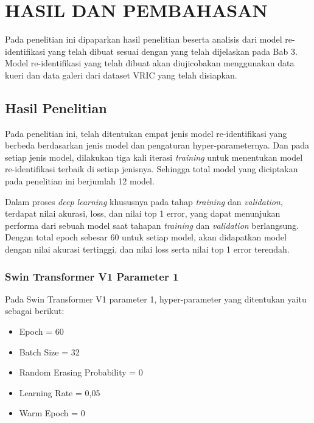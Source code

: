\chapter{HASIL DAN PEMBAHASAN}
\label{chap:hasildanpembahasan}


Pada penelitian ini dipaparkan hasil penelitian beserta analisis dari model re-identifikasi yang telah dibuat sesuai dengan 
yang telah dijelaskan pada Bab 3. Model re-identifikasi yang telah dibuat akan diujicobakan menggunakan data 
kueri dan data galeri dari dataset VRIC yang telah disiapkan. 

\section{Hasil Penelitian}
\label{sec:hasilpenelitian}

Pada penelitian ini, telah ditentukan empat jenis model re-identifikasi yang berbeda \linebreak berdasarkan jenis model dan pengaturan 
hyper-parameternya. Dan pada setiap jenis model, dilakukan tiga kali iterasi \emph{training} untuk menentukan model re-identifikasi 
terbaik di setiap jenisnya. Sehingga total model yang diciptakan pada penelitian ini berjumlah 12 model. 

Dalam proses \emph{deep learning} khususnya pada tahap \emph{training} dan \emph{validation}, terdapat nilai  akurasi, loss, dan 
nilai top 1 error, yang dapat menunjukan performa dari sebuah model saat tahapan \emph{training} dan \emph{validation} berlangsung. 
Dengan total epoch sebesar 60 untuk setiap model, akan didapatkan model dengan nilai akurasi tertinggi, dan nilai loss serta nilai 
top 1 error terendah. 

\subsection{Swin Transformer V1 Parameter 1}

Pada Swin Transformer V1 parameter 1, hyper-parameter yang ditentukan yaitu sebagai berikut:

\begin{itemize}[nolistsep]
  \item Epoch = 60
  \item Batch Size = 32
  \item Random Erasing Probability = 0
  \item Learning Rate = 0,05
  \item Warm Epoch = 0
\end{itemize}

